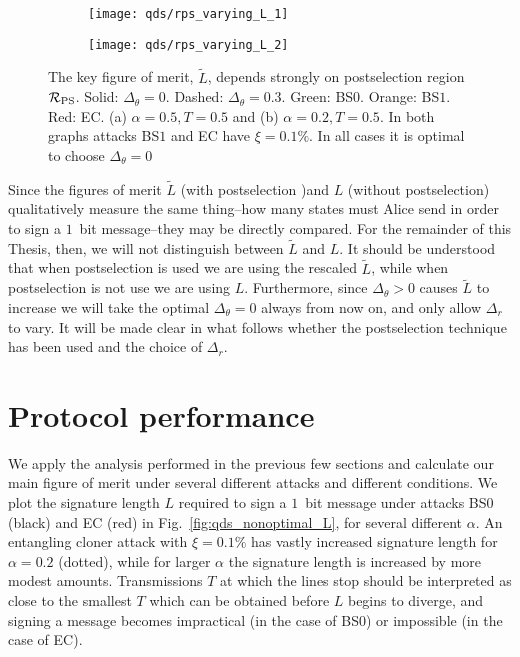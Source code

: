 \begin{figure}[htp]
\captionsetup{width=0.8\linewidth}
\centering
	\begin{subfigure}{0.49\linewidth}
		\centering
		\texttt{[image: qds/rps\_varying\_L\_1]}
		\caption{}
	\end{subfigure}
	\begin{subfigure}{0.49\linewidth}
		\centering
		\texttt{[image: qds/rps\_varying\_L\_2]}
		\caption{}
	\end{subfigure}
\caption{\label{fig:qds_L_vs_deltar} The key figure of merit, $\tilde{L}$, depends strongly on postselection region $\mathcal{R}_{\text{PS}}$. Solid: $\Delta_\theta=0$. Dashed: $\Delta_\theta = 0.3$. Green: BS$0$. Orange: BS$1$. Red: EC. (a) $\alpha = 0.5, T = 0.5$ and (b) $\alpha=0.2, T=0.5$. In both graphs attacks BS$1$ and EC have $\xi = 0.1 \%$. In all cases it is optimal to choose $\Delta_\theta = 0$}
\end{figure}

Since the figures of merit $\tilde{L}$ (with postselection )and $L$ (without postselection) qualitatively measure the same thing--how many states must Alice send in order to sign a $1$~bit message--they may be directly compared. For the remainder of this Thesis, then, we will not distinguish between $\tilde{L}$ and $L$. It should be understood that when postselection is used we are using the rescaled $\tilde{L}$, while when postselection is not use we are using $L$. Furthermore, since $\Delta_\theta > 0$ causes $\tilde{L}$ to increase we will take the optimal $\Delta_\theta=0$ always from now on, and only allow $\Delta_r$ to vary. It will be made clear in what follows whether the postselection technique has been used and the choice of $\Delta_r$.



\section{Protocol performance}\label{sec:qds_protocol_performance}
We apply the analysis performed in the previous few sections and calculate our main figure of merit under several different attacks and different conditions. We plot the signature length $L$ required to sign a $1$~bit message under attacks BS$0$ (black) and EC (red) in Fig.~\ref{fig:qds_nonoptimal_L}, for several different $\alpha$. An entangling cloner attack with $\xi = 0.1\%$ has vastly increased signature length for $\alpha=0.2$ (dotted), while for larger $\alpha$ the signature length is increased by more modest amounts. Transmissions $T$ at which the lines stop should be interpreted as close to the smallest $T$ which can be obtained before $L$ begins to diverge, and signing a message becomes impractical (in the case of BS$0$) or impossible (in the case of EC).





